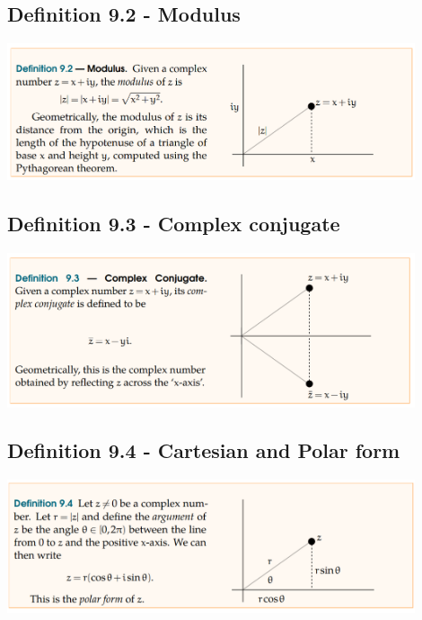 \documentclass{article}
\begin{document}
\subsection{Definition 9.2 - Modulus}
\begin{center}
    \includegraphics[width=0.9\textwidth]{Definition 9.2}\\
\end{center}


\subsection{Definition 9.3 - Complex conjugate}
\begin{center}
    \includegraphics[width=0.9\textwidth]{Definition 9.3}\\
\end{center}


\subsection{Definition 9.4 - Cartesian and Polar form}
\begin{center}
    \includegraphics[width=0.9\textwidth]{Definition 9.4}\\
\end{center}
\end{document}
